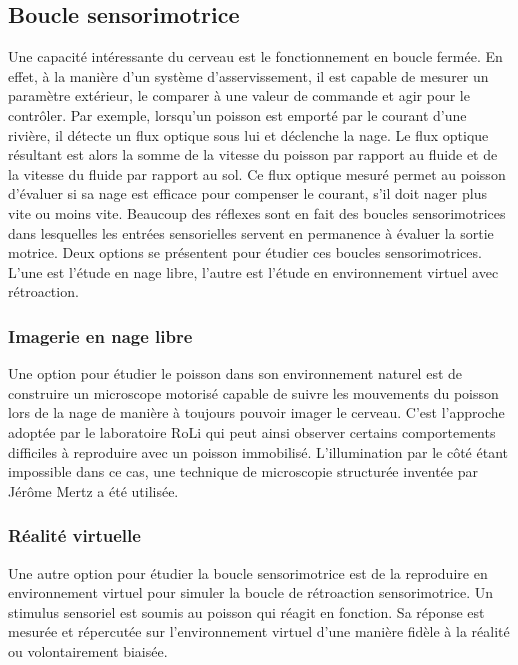\subsection{Boucle sensorimotrice}

Une capacité intéressante du cerveau est le fonctionnement en boucle fermée. En effet, à la manière d'un système d'asservissement, il est capable de mesurer un paramètre extérieur, le comparer à une valeur de commande et agir pour le contrôler. Par exemple, lorsqu'un poisson est emporté par le courant d'une rivière, il détecte un flux optique sous lui et déclenche la nage. Le flux optique résultant est alors la somme de la vitesse du poisson par rapport au fluide et de la vitesse du fluide par rapport au sol. Ce flux optique mesuré permet au poisson d'évaluer si sa nage est efficace pour compenser le courant, s'il doit nager plus vite ou moins vite. Beaucoup des réflexes sont en fait des boucles sensorimotrices dans lesquelles les entrées sensorielles servent en permanence à évaluer la sortie motrice. Deux options se présentent pour étudier ces boucles sensorimotrices. L'une est l'étude en nage libre, l'autre est l'étude en environnement virtuel avec rétroaction.

\subsubsection{Imagerie en nage libre}

Une option pour étudier le poisson dans son environnement naturel est de construire un microscope motorisé capable de suivre les mouvements du poisson lors de la nage de manière à toujours pouvoir imager le cerveau. C'est l'approche adoptée par le laboratoire RoLi \cite{kim_pan-neuronal_2017} qui peut ainsi observer certains comportements difficiles à reproduire avec un poisson immobilisé. L'illumination par le côté étant impossible dans ce cas, une technique de microscopie structurée inventée par Jérôme Mertz \cite{mertz_optical_2011} a été utilisée.


\subsubsection{Réalité virtuelle}

Une autre option pour étudier la boucle sensorimotrice est de la reproduire en environnement virtuel pour simuler la boucle de rétroaction sensorimotrice. Un stimulus sensoriel est soumis au poisson qui réagit en fonction. Sa réponse est mesurée et répercutée sur l'environnement virtuel d'une manière fidèle à la réalité ou volontairement biaisée.

